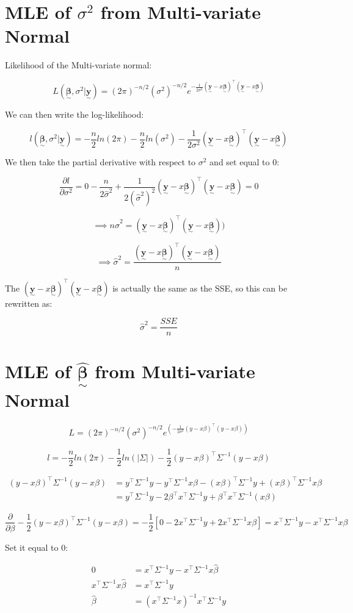 \documentclass{article}
\newcommand{\svec}[1]{\underset{\sim}{\bm{#1}}} %
\begin{document}
\section{MLE of $\sigma^2$ from Multi-variate Normal}

Likelihood of the Multi-variate normal: 

$$L(\svec{\beta}, \sigma^2 | \svec{y}) = (2\pi)^{-n/2}(\sigma^2)^{-n/2} e^{-\frac{1}{2\sigma^2}(\svec{y} - x\svec{\beta})^{\top}(\svec{y} - x\svec{\beta})}$$

We can then write the log-likelihood:

$$l(\svec{\beta}, \sigma^2 | \svec{y}) = -\frac{n}{2}ln(2\pi) - \frac{n}{2}ln(\sigma^2) - \frac{1}{2\sigma^2}(\svec{y} - x\svec{\beta})^{\top}(\svec{y} - x\svec{\beta})$$

We then take the partial derivative with respect to $\sigma^2$ and set equal to $0$:

$$\frac{\partial l}{\partial \sigma^2} = 0 - \frac{n}{2\hat{\sigma}^2} + \frac{1}{2(\hat{\sigma}^2)^2}(\svec{y} - x\svec{\beta})^{\top}(\svec{y} - x\svec{\beta}) = 0$$

$$\implies n\hat{\sigma}^2 = (\svec{y} - x\svec{\beta})^{\top}(\svec{y} - x\svec{\beta}))$$

$$\implies \hat{\sigma}^2 = \frac{(\svec{y} - x\svec{\beta})^{\top}(\svec{y} - x\svec{\beta})}{n}$$

The $(\svec{y} - x\svec{\beta})^{\top}(\svec{y} - x\svec{\beta})$ is actually the same as the SSE, so this can be rewritten as:

$$\hat{\sigma}^2 = \frac{SSE}{n}$$


\section{MLE of $\hat{\svec{\beta}}$ from Multi-variate Normal}

$$L = (2\pi)^{-n/2}(\sigma^2)^{-n/2}e^{(-\frac{1}{2\sigma^2}(y-x\beta)^{\top}(y-x\beta))}$$

$$l = -\frac{n}{2}ln(2\pi) - \frac{1}{2}ln(|\Sigma|) - \frac{1}{2}(y-x\beta)^{\top}\Sigma^{-1}(y-x\beta)$$

$$
\begin{aligned}
(y-x\beta)^{\top}\Sigma^{-1}(y-x\beta) 
& = y^{\top}\Sigma^{-1}y - y^{\top}\Sigma^{-1}x\beta - (x\beta)^{\top}\Sigma^{-1}y + (x\beta)^{\top}\Sigma^{-1}x\beta \\
& = y^{\top}\Sigma^{-1}y - 2\beta^{\top}x^{\top}\Sigma^{-1}y + \beta^{\top}x^{\top}\Sigma^{-1}(x\beta)
\end{aligned}$$

$$\frac{\partial}{\partial \beta} -\frac{1}{2}(y-x\beta)^{\top}\Sigma^{-1}(y-x\beta) = -\frac{1}{2}[0 - 2x^{\top}\Sigma^{-1}y + 2x^{\top}\Sigma^{-1}x\beta] = x^{\top}\Sigma^{-1}y - x^{\top}\Sigma^{-1}x\beta$$

Set it equal to 0: 

$$
\begin{aligned}
0 &= x^{\top}\Sigma^{-1}y - x^{\top}\Sigma^{-1}x\hat{\beta} \\
x^{\top}\Sigma^{-1}x\hat{\beta} &= x^{\top}\Sigma^{-1}y \\
\hat{\beta} &= (x^{\top}\Sigma^{-1}x)^{-1}x^{\top}\Sigma^{-1}y
\end{aligned}$$
\end{document}
